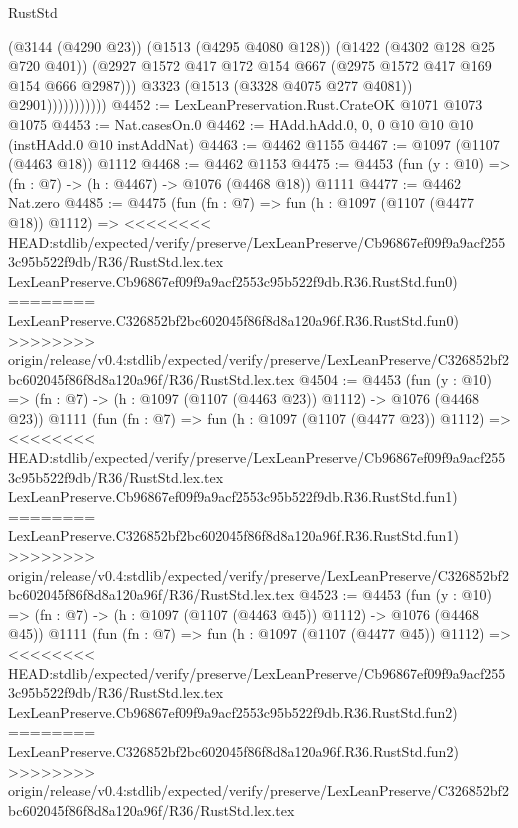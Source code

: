 \begin{lexlean}{RustStd}
\begin{coremodule}
{\begin{coremodule}
{{{{{{{{                            (@3144 (@4290 @23))
                            (@1513 (@4295 @4080 @128))
                            (@1422 (@4302 @128 @25 @720 @401))
                            (@2927
                              @1572
                              @417
                              @172
                              @154
                              @667
                              (@2975 @1572 @417 @169 @154 @666 @2987)))
                          @3323
                          (@1513 (@3328 @4075 @277 @4081))
                          @2901)))))))))))
@4452 := LexLeanPreservation.Rust.CrateOK @1071 @1073 @1075
@4453 := Nat.casesOn.{0}
@4462 := HAdd.hAdd.{0, 0, 0} @10 @10 @10 (instHAdd.{0} @10 instAddNat)
@4463 := @4462 @1155
@4467 := @1097 (@1107 (@4463 @18)) @1112
@4468 := @4462 @1153
@4475 := @4453 (fun (y : @10) => (fn : @7) -> (h : @4467) -> @1076 (@4468 @18)) @1111
@4477 := @4462 Nat.zero
@4485 := @4475
    (fun (fn : @7) =>
    fun (h : @1097 (@1107 (@4477 @18)) @1112) =>
<<<<<<<< HEAD:stdlib/expected/verify/preserve/LexLeanPreserve/Cb96867ef09f9a9acf2553c95b522f9db/R36/RustStd.lex.tex
    LexLeanPreserve.Cb96867ef09f9a9acf2553c95b522f9db.R36.RustStd.fun0)
========
    LexLeanPreserve.C326852bf2bc602045f86f8d8a120a96f.R36.RustStd.fun0)
>>>>>>>> origin/release/v0.4:stdlib/expected/verify/preserve/LexLeanPreserve/C326852bf2bc602045f86f8d8a120a96f/R36/RustStd.lex.tex
@4504 := @4453
    (fun (y : @10) => (fn : @7) -> (h : @1097 (@1107 (@4463 @23)) @1112) -> @1076 (@4468 @23))
    @1111
    (fun (fn : @7) =>
    fun (h : @1097 (@1107 (@4477 @23)) @1112) =>
<<<<<<<< HEAD:stdlib/expected/verify/preserve/LexLeanPreserve/Cb96867ef09f9a9acf2553c95b522f9db/R36/RustStd.lex.tex
    LexLeanPreserve.Cb96867ef09f9a9acf2553c95b522f9db.R36.RustStd.fun1)
========
    LexLeanPreserve.C326852bf2bc602045f86f8d8a120a96f.R36.RustStd.fun1)
>>>>>>>> origin/release/v0.4:stdlib/expected/verify/preserve/LexLeanPreserve/C326852bf2bc602045f86f8d8a120a96f/R36/RustStd.lex.tex
@4523 := @4453
    (fun (y : @10) => (fn : @7) -> (h : @1097 (@1107 (@4463 @45)) @1112) -> @1076 (@4468 @45))
    @1111
    (fun (fn : @7) =>
    fun (h : @1097 (@1107 (@4477 @45)) @1112) =>
<<<<<<<< HEAD:stdlib/expected/verify/preserve/LexLeanPreserve/Cb96867ef09f9a9acf2553c95b522f9db/R36/RustStd.lex.tex
    LexLeanPreserve.Cb96867ef09f9a9acf2553c95b522f9db.R36.RustStd.fun2)
========
    LexLeanPreserve.C326852bf2bc602045f86f8d8a120a96f.R36.RustStd.fun2)
>>>>>>>> origin/release/v0.4:stdlib/expected/verify/preserve/LexLeanPreserve/C326852bf2bc602045f86f8d8a120a96f/R36/RustStd.lex.tex
}}}}}}}}
\end{coremodule}}
\end{coremodule}
\end{lexlean}
